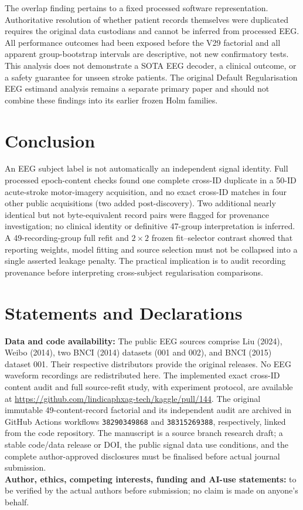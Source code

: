 \documentclass[11pt,a4paper]{article}
\begin{document}
The overlap finding pertains to a fixed processed software
representation. Authoritative resolution of whether patient
records themselves were duplicated requires the original
data custodians and cannot be inferred from processed EEG.
All performance outcomes had been exposed before the V29
factorial and all apparent group-bootstrap intervals are
descriptive, not new confirmatory tests. This analysis does
not demonstrate a SOTA EEG decoder, a clinical outcome, or
a safety guarantee for unseen stroke patients. The
original Default Regularisation EEG estimand analysis
remains a separate primary paper and should not combine
these findings into its earlier frozen Holm families.

\section{Conclusion}
An EEG subject label is not automatically an independent
signal identity. Full processed epoch-content checks found
one complete cross-ID duplicate in a 50-ID acute-stroke
motor-imagery acquisition, and no exact cross-ID matches
in four other public acquisitions (two added post-discovery).
Two additional nearly identical but not byte-equivalent
record pairs were flagged for provenance investigation;
no clinical identity or definitive 47-group interpretation
is inferred. A 49-recording-group
full refit and $2\times2$ frozen fit--selector contrast
showed that reporting weights, model fitting and source
selection must not be collapsed into a single asserted
leakage penalty. The practical implication is to audit
recording provenance before interpreting cross-subject
regularisation comparisons.

\section*{Statements and Declarations}
\textbf{Data and code availability:}
The public EEG sources comprise Liu (2024),
Weibo (2014), two BNCI (2014) datasets
(001 and 002), and BNCI (2015) dataset 001.
Their respective distributors provide the original releases.
No EEG waveform recordings are redistributed here.
The implemented exact cross-ID content audit and
full source-refit study, with experiment protocol,
are available at
\url{https://github.com/lindicaphxag-tech/kaggle/pull/144}.
The original immutable 49-content-record
factorial and its independent audit are archived
in GitHub Actions workflows
\texttt{38290349868} and \texttt{38315269388},
respectively, linked from the code repository. The manuscript is a source branch
research draft; a stable code/data release or DOI,
the public signal data use conditions, and
the complete author-approved disclosures
must be finalised before actual journal submission.\\
\textbf{Author, ethics, competing interests,
funding and AI-use statements:} to be verified by
the actual authors before submission; no claim is made
on anyone's behalf.



\end{document}
